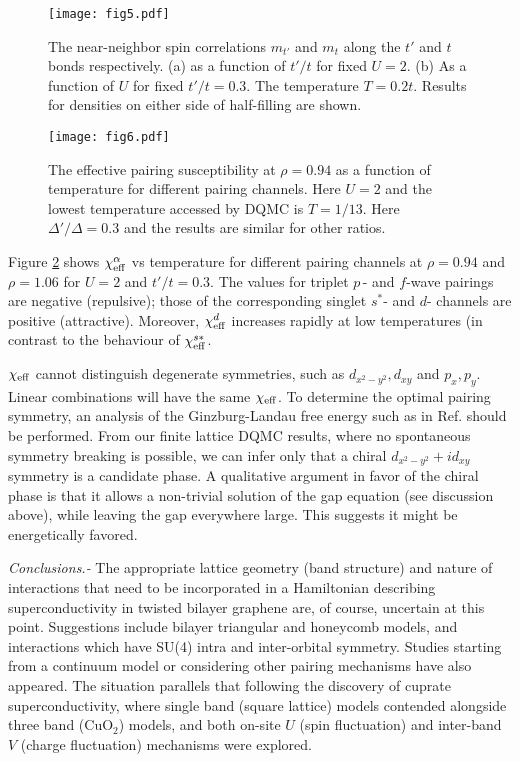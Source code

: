 \documentclass[%
 reprint,
 amsmath,amssymb,
 aps,
]{revtex4-1}
\begin{document}
\begin{figure}[htbp]
\centering \texttt{[image: fig5.pdf]} \caption{The
near-neighbor spin correlations $m_{t'}$ and $m_t$
along the $t'$ and $t$ bonds respectively.  (a) as a function of
$t'/t$ for fixed $U=2$.  (b) As a function of $U$ for fixed
$t'/t=0.3$.  The temperature $T=0.2t$.  Results for densities
on either side of half-filling are shown.
}
\label{fig5}
\end{figure}

\begin{figure}[htbp]
\centering \texttt{[image: fig6.pdf]} \caption{The
effective pairing susceptibility at $\rho=0.94$ as a function of
temperature for different pairing channels. Here $U=2$ and the lowest
temperature accessed by DQMC is $T=1/13$. Here $\Delta'/\Delta=0.3$ and
the results are similar for other ratios.}
\label{fig6}
\end{figure}

Figure \ref{fig6} shows $\chi^\alpha_{\rm eff}$ vs
temperature for different pairing channels at $\rho=0.94$ and $\rho=1.06$
for $U=2$ and $t'/t=0.3$.
The values for triplet $p\,$- and $f$-wave pairings are negative
(repulsive);
those of the corresponding singlet $s^*$- and $d$-
channels are positive (attractive).
Moreover,
$\chi^d_{\rm eff}$ increases rapidly at low
temperatures (in contrast to the behaviour of
$\chi^{s*}_{\rm eff}$.

$\chi_{\rm eff}$
cannot distinguish
degenerate symmetries, such as $d_{x^2-y^2}, d_{xy}$ and $p_x, p_y$.
Linear combinations will have the same $\chi_{\rm eff}$.
To determine the optimal pairing symmetry, an analysis of the
Ginzburg-Landau free energy such as in Ref.\cite{nandkishore12} should be performed.
From our finite lattice DQMC results, where no spontaneous symmetry
breaking is possible, we can infer only that a
chiral $d_{x^2-y^2}+id_{xy}$ symmetry is a candidate phase.
A qualitative argument in favor of
the chiral phase is that it allows a non-trivial
solution of the gap equation (see discussion above),
while leaving the gap everywhere large.  This suggests
it might be energetically favored\cite{sc2}.




\textit{Conclusions.-}
The appropriate lattice geometry (band structure) and nature of
interactions that need to be incorporated in a Hamiltonian describing
superconductivity in twisted bilayer graphene are, of course, uncertain
at this point.  Suggestions include bilayer triangular and honeycomb
models\cite{xu18,po18,fu18,xyxu18}, and interactions which have SU(4) intra and
inter-orbital symmetry. Studies starting from a
continuum model\cite{bitan18} or considering other pairing
mechanisms\cite{phillips18} have also appeared.
The situation parallels that following the
discovery of cuprate superconductivity, where single band (square
lattice) models contended alongside three band (CuO$_2$) models, and
both on-site $U$ (spin fluctuation) and inter-band $V$ (charge
fluctuation) mechanisms were explored.
\end{document}
